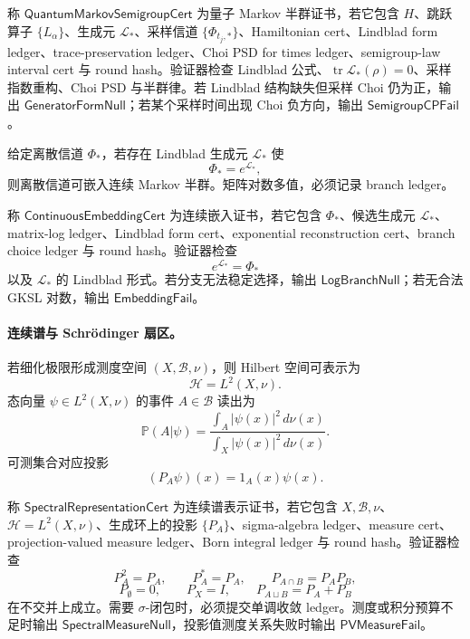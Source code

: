 \begin{definition}\label{def:typed-address-biaxial-completion-quantum-markov-semigroup-cert}
称 \(\mathsf{QuantumMarkovSemigroupCert}\) 为量子 Markov 半群证书，若它包含 \(H\)、跳跃算子 \(\{L_\alpha\}\)、生成元 \(\mathcal L_{\ast}\)、采样信道 \(\{\Phi_{t_j,\ast}\}\)、Hamiltonian cert、Lindblad form ledger、trace-preservation ledger、Choi PSD for times ledger、semigroup-law interval cert 与 round hash。验证器检查 Lindblad 公式、\(\operatorname{tr}\mathcal L_{\ast}(\rho)=0\)、采样指数重构、Choi PSD 与半群律。若 Lindblad 结构缺失但采样 Choi 仍为正，输出 \(\mathsf{GeneratorFormNull}\)；若某个采样时间出现 Choi 负方向，输出 \(\mathsf{SemigroupCPFail}\)。
\end{definition}

给定离散信道 \(\Phi_{\ast}\)，若存在 Lindblad 生成元 \(\mathcal L_{\ast}\) 使
\[
\Phi_{\ast}=e^{\mathcal L_{\ast}},
\]
则离散信道可嵌入连续 Markov 半群。矩阵对数多值，必须记录 branch ledger。

\begin{definition}[连续嵌入证书]\label{def:typed-address-biaxial-completion-continuous-embedding-cert}
称 \(\mathsf{ContinuousEmbeddingCert}\) 为连续嵌入证书，若它包含 \(\Phi_{\ast}\)、候选生成元 \(\mathcal L_{\ast}\)、matrix-log ledger、Lindblad form cert、exponential reconstruction cert、branch choice ledger 与 round hash。验证器检查
\[
e^{\mathcal L_{\ast}}=\Phi_{\ast}
\]
以及 \(\mathcal L_{\ast}\) 的 Lindblad 形式。若分支无法稳定选择，输出 \(\mathsf{LogBranchNull}\)；若无合法 GKSL 对数，输出 \(\mathsf{EmbeddingFail}\)。
\end{definition}

\paragraph{连续谱与 Schr\"odinger 扇区。}
若细化极限形成测度空间 \((X,\mathcal B,\nu)\)，则 Hilbert 空间可表示为
\[
\mathcal H=L^2(X,\nu).
\]
态向量 \(\psi\in L^2(X,\nu)\) 的事件 \(A\in\mathcal B\) 读出为
\[
\boxed{
\mathbb P(A|\psi)=
\frac{\int_A|\psi(x)|^2\,d\nu(x)}
{\int_X|\psi(x)|^2\,d\nu(x)}.
}
\]
可测集合对应投影
\[
(P_A\psi)(x)=1_A(x)\psi(x).
\]

\begin{definition}[谱表示证书]\label{def:typed-address-biaxial-completion-spectral-representation-cert}
称 \(\mathsf{SpectralRepresentationCert}\) 为连续谱表示证书，若它包含 \(X,\mathcal B,\nu\)、\(\mathcal H=L^2(X,\nu)\)、生成环上的投影 \(\{P_A\}\)、sigma-algebra ledger、measure cert、projection-valued measure ledger、Born integral ledger 与 round hash。验证器检查
\[
P_A^2=P_A,\qquad P_A^*=P_A,\qquad P_{A\cap B}=P_AP_B,
\]
\[
P_\emptyset=0,\qquad P_X=I,
\qquad
P_{A\sqcup B}=P_A+P_B
\]
在不交并上成立。需要 \(\sigma\)-闭包时，必须提交单调收敛 ledger。测度或积分预算不足时输出 \(\mathsf{SpectralMeasureNull}\)，投影值测度关系失败时输出 \(\mathsf{PVMeasureFail}\)。
\end{definition}

